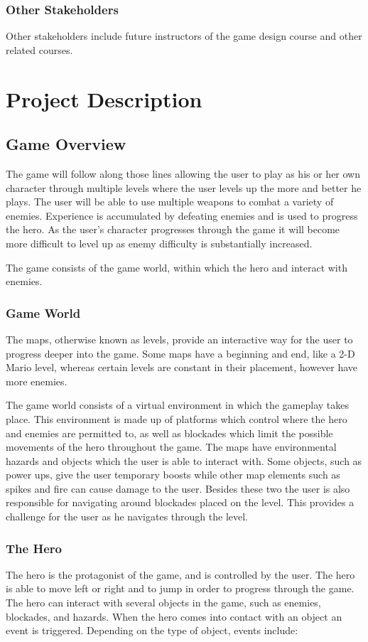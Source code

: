\documentclass[12pt, titlepage]{article}
\begin{document}
\subsubsection{Other Stakeholders}
Other stakeholders include future instructors of the game design course and other related courses.
\section{Project Description}
\subsection{Game Overview}
The game will follow along those lines allowing the user to play as his or her own character through multiple levels where the user levels up the more and better he plays. The user will be able to use multiple weapons to combat a variety of enemies.  Experience is accumulated by defeating enemies and is used to progress the hero. As the user’s character progresses through the game it will become more difficult to level up as enemy difficulty is substantially increased.

The game consists of the game world, within which the hero and interact with enemies.

\subsubsection{Game World}
The maps, otherwise known as levels, provide an interactive way for the user to progress deeper into the game. Some maps have a beginning and end, like a 2-D Mario level, whereas certain levels are constant in their placement, however have more enemies.
 
The game world consists of a virtual environment in which the gameplay takes place.  This environment is made up of platforms which control where the hero and enemies are permitted to, as well as blockades which limit the possible movements of the hero throughout the game.   The maps have environmental hazards and objects which the user is able to interact with. Some objects, such as power ups, give the user temporary boosts while other map elements such as spikes and fire can cause damage to the user. Besides these two the user is also responsible for navigating around blockades placed on the level. This provides a challenge for the user as he navigates through the level.


\subsubsection{The Hero}
The hero is the protagonist of the game, and is controlled by the user.  The hero is able to move left or right and to jump in order to progress through the game.  The hero can interact with several objects in the game, such as enemies, blockades, and hazards.  When the hero comes into contact with an object an event is triggered.  Depending on the type of object, events include:
\end{document}
